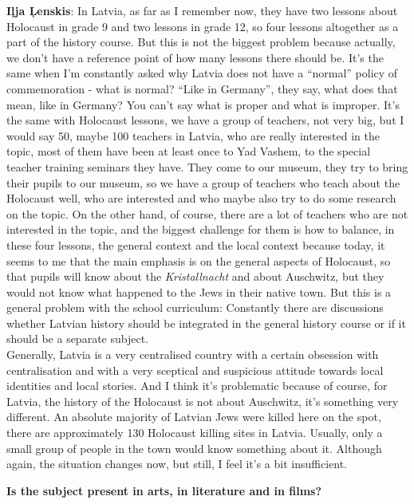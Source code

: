 \textbf{Iļja Ļenskis}: In Latvia, as far as I remember now, they have two lessons about Holocaust in grade 9 and two lessons in grade 12, so four lessons altogether as a part of the history course. But this is not the biggest problem because actually, we don’t have a reference point of how many lessons there should be. It's the same when I’m constantly asked why Latvia does not have a ``normal'' policy of commemoration - what is normal? ``Like in Germany'', they say, what does that mean, like in Germany?  You can’t say what is proper and what is improper. It's the same with Holocaust lessons, we have a group of teachers, not very big, but I would say 50, maybe 100 teachers in Latvia, who are really interested in the topic, most of them have been at least once to Yad Vashem, to the special teacher training seminars they have. They come to our museum, they try to bring their pupils to our museum, so we have a group of teachers who teach about the Holocaust well, who are interested and who maybe also try to do some research on the topic. On the other hand, of course, there are a lot of teachers who are not interested in the topic, and the biggest challenge for them is how to balance, in these four lessons, the general context and the local context because today, it seems to me that the main emphasis is on the general aspects of Holocaust, so that pupils will know about the \textit{Kristallnacht} and about Auschwitz, but they would not know what happened to the Jews in their native town. But this is a general problem with the school curriculum: Constantly there are discussions whether Latvian history should be integrated in the general history course or if it should be a separate subject.\\
Generally, Latvia is a very centralised country with a certain obsession with centralisation and with a very sceptical and suspicious attitude towards local identities and local stories. And I think it’s problematic because of course, for Latvia, the history of the Holocaust is not about Auschwitz, it’s something very different. An absolute majority of Latvian Jews were killed here on the spot, there are approximately 130 Holocaust killing sites in Latvia. Usually, only a small group of people in the town would know something about it. Although again, the situation changes now, but still, I feel it’s a bit insufficient. 

\textbf{Is the subject present in arts, in literature and in films?} 

